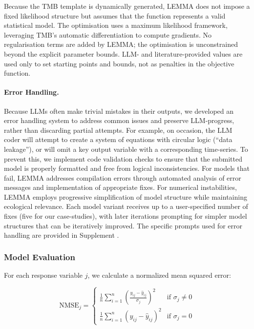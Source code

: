 Because the TMB template is dynamically generated, LEMMA does not impose a fixed likelihood structure but assumes that the function represents a valid statistical model. The optimisation uses a maximum likelihood framework, leveraging TMB’s automatic differentiation to compute gradients. No regularisation terms are added by LEMMA; the optimisation is unconstrained beyond the explicit parameter bounds. LLM- and literature-provided values are used only to set starting points and bounds, not as penalties in the objective function.

\paragraph{Error Handling.}
Because LLMs often make trivial mistakes in their outputs, we developed an error handling system to address common issues and preserve LLM-progress, rather than discarding partial attempts. For example, on occasion, the LLM coder will attempt to create a system of equations with circular logic (``data leakage''), or will omit a key output variable with a corresponding time-series. To prevent this, we implement code validation checks to ensure that the submitted model is properly formatted and free from logical inconsistencies. For models that fail, LEMMA addresses compilation errors through automated analysis of error messages and implementation of appropriate fixes. For numerical instabilities, LEMMA employs progressive simplification of model structure while maintaining ecological relevance. Each model variant receives up to a user-specified number of fixes (five for our case-studies), with later iterations prompting for simpler model structures that can be iteratively improved. The specific prompts used for error handling are provided in Supplement%
.

\subsubsection{Model Evaluation}

For each response variable $j$, we calculate a normalized mean squared error:

\begin{equation}
    \text{NMSE}_j = \begin{cases}
        \frac{1}{n} \sum_{i=1}^{n} \left(\frac{y_{ij} - \hat{y}_{ij}}{\sigma_j}\right)^2 & \text{if } \sigma_j \neq 0 \\
        \frac{1}{n} \sum_{i=1}^{n} (y_{ij} - \hat{y}_{ij})^2 & \text{if } \sigma_j = 0
    \end{cases}
\end{equation}

